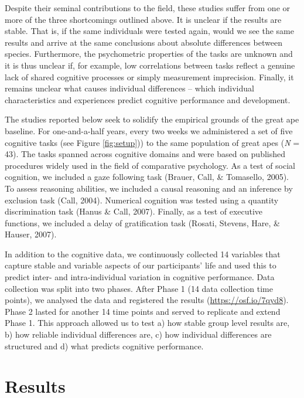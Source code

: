 \documentclass[
  man,floatsintext]{apa6}
\begin{document}
Despite their seminal contributions to the field, these studies suffer from one or more of the three shortcomings outlined above. It is unclear if the results are stable. That is, if the same individuals were tested again, would we see the same results and arrive at the same conclusions about absolute differences between species. Furthermore, the psychometric properties of the tasks are unknown and it is thus unclear if, for example, low correlations between tasks reflect a genuine lack of shared cognitive processes or simply measurement imprecision. Finally, it remains unclear what causes individual differences -- which individual characteristics and experiences predict cognitive performance and development.

The studies reported below seek to solidify the empirical grounds of the great ape baseline. For one-and-a-half years, every two weeks we administered a set of five cognitive tasks (see Figure \ref{fig:setup})) to the same population of great apes (\emph{N} = 43). The tasks spanned across cognitive domains and were based on published procedures widely used in the field of comparative psychology. As a test of social cognition, we included a gaze following task (Brauer, Call, \& Tomasello, 2005). To assess reasoning abilities, we included a causal reasoning and an inference by exclusion task (Call, 2004). Numerical cognition was tested using a quantity discrimination task (Hanus \& Call, 2007). Finally, as a test of executive functions, we included a delay of gratification task (Rosati, Stevens, Hare, \& Hauser, 2007).

In addition to the cognitive data, we continuously collected 14 variables that capture stable and variable aspects of our participants' life and used this to predict inter- and intra-individual variation in cognitive performance. Data collection was split into two phases. After Phase 1 (14 data collection time points), we analysed the data and registered the results (\url{https://osf.io/7qyd8}). Phase 2 lasted for another 14 time points and served to replicate and extend Phase 1. This approach allowed us to test a) how stable group level results are, b) how reliable individual differences are, c) how individual differences are structured and d) what predicts cognitive performance.

\hypertarget{results}{%
\section{Results}\label{results}}
\end{document}
